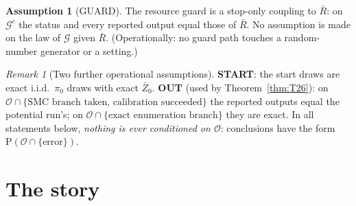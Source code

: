 \documentclass[11pt]{article}
\theoremstyle{definition}
\newtheorem{assumption}{Assumption}
\theoremstyle{remark}
\newtheorem{remark}{Remark}
\renewcommand{\Pr}{\mathrm{P}}
\newcommand{\cO}{\mathcal O}
\newcommand{\cG}{\mathcal G}
\begin{document}
\begin{assumption}[GUARD]\label{as:guard}
The resource guard is a stop-only coupling to $\bar R$: on $\cG^c$ the status and every reported output equal those
of $\bar R$. No assumption is made on the law of $\cG$ given $\bar R$. (Operationally: no guard path touches a
random-number generator or a setting.)
\end{assumption}

\begin{remark}[Two further operational assumptions]\label{rem:outstart}
\textbf{START}: the start draws are exact i.i.d.\ $\pi_0$ draws with exact $\bar Z_0$. \textbf{OUT} (used by
Theorem~\ref{thm:T26}): on $\cO\cap\{\text{SMC branch taken, calibration succeeded}\}$ the reported outputs equal the
potential run's; on $\cO\cap\{\text{exact enumeration branch}\}$ they are exact. In all statements below,
\emph{nothing is ever conditioned on $\cO$}: conclusions have the form $\Pr(\cO\cap\{\text{error}\})$.
\end{remark}

\section{The story}\label{sec:story}
\end{document}

